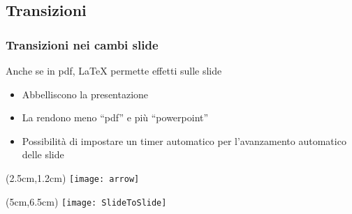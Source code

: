 \subsection{Transizioni} 
\begin{frame}
  \frametitle{Transizioni nei cambi slide}
  
  Anche se in pdf, \LaTeX{} permette effetti sulle slide
  \begin{itemize}
    \item Abbelliscono la presentazione
    \item La rendono meno ``pdf'' e più ``powerpoint''
    \item Possibilità di impostare un timer automatico per l'avanzamento 
automatico delle slide
  \end{itemize}
  
  \begin{textblock*}{5cm}(2.5cm,1.2cm)
    \texttt{[image: arrow]}
  \end{textblock*}
  
  \begin{textblock*}{5cm}(5cm,6.5cm)
    \texttt{[image: SlideToSlide]}
  \end{textblock*}

\end{frame}

